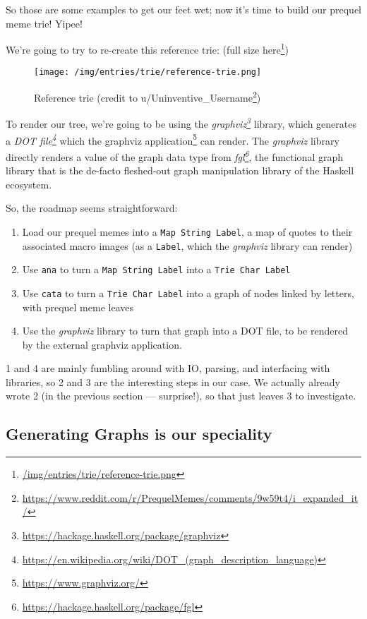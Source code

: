 \documentclass[]{article}
\renewcommand{\href}[2]{#2\footnote{\url{#1}}}
\begin{document}
So those are some examples to get our feet wet; now it's time to build our
prequel meme trie! Yipee!

We're going to try to re-create this reference trie:
(\href{/img/entries/trie/reference-trie.png}{full size here})

\begin{figure}
\centering
\texttt{[image: /img/entries/trie/reference-trie.png]}
\caption{Reference trie (credit to
\href{https://www.reddit.com/r/PrequelMemes/comments/9w59t4/i_expanded_it/}{u/Uninventive\_Username})}
\end{figure}

To render our tree, we're going to be using the
\emph{\href{https://hackage.haskell.org/package/graphviz}{graphviz}} library,
which generates a
\emph{\href{https://en.wikipedia.org/wiki/DOT_(graph_description_language)}{DOT
file}} which the \href{https://www.graphviz.org/}{graphviz application} can
render. The \emph{graphviz} library directly renders a value of the graph data
type from \emph{\href{https://hackage.haskell.org/package/fgl}{fgl}}, the
functional graph library that is the de-facto fleshed-out graph manipulation
library of the Haskell ecosystem.

So, the roadmap seems straightforward:

\begin{enumerate}
\def\labelenumi{\arabic{enumi}.}
\tightlist
\item
  Load our prequel memes into a \texttt{Map\ String\ Label}, a map of quotes to
  their associated macro images (as a \texttt{Label}, which the \emph{graphviz}
  library can render)
\item
  Use \texttt{ana} to turn a \texttt{Map\ String\ Label} into a
  \texttt{Trie\ Char\ Label}
\item
  Use \texttt{cata} to turn a \texttt{Trie\ Char\ Label} into a graph of nodes
  linked by letters, with prequel meme leaves
\item
  Use the \emph{graphviz} library to turn that graph into a DOT file, to be
  rendered by the external graphviz application.
\end{enumerate}

1 and 4 are mainly fumbling around with IO, parsing, and interfacing with
libraries, so 2 and 3 are the interesting steps in our case. We actually already
wrote 2 (in the previous section --- surprise!), so that just leaves 3 to
investigate.

\hypertarget{generating-graphs-is-our-speciality}{%
\subsection{Generating Graphs is our
speciality}\label{generating-graphs-is-our-speciality}}
\end{document}
